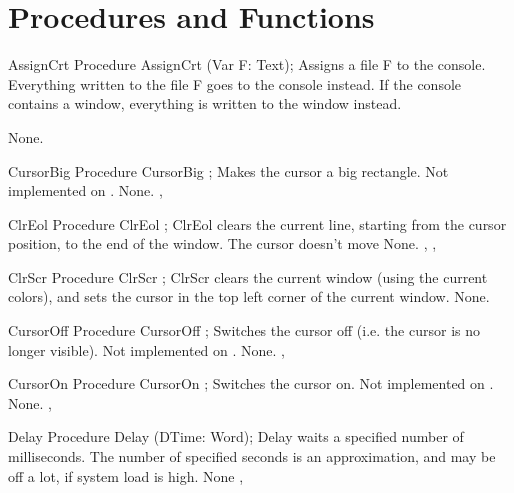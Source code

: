 \section{Procedures and Functions}

\begin{procedure}{AssignCrt}
\Declaration
Procedure AssignCrt (Var F: Text);
\Description
{} Assigns a file F to the console. Everything written to 
the file F goes to the console instead. If the console contains a window, 
everything is written to the window instead.

\Errors
None.
\SeeAlso
{}
\end{procedure}

 
\begin{procedure}{CursorBig}
\Declaration
Procedure CursorBig ;
\Description
Makes the cursor a big rectangle. 
Not implemented on \linux.
\Errors
None.
\SeeAlso
{}, 
\end{procedure}

\begin{procedure}{ClrEol}
\Declaration
Procedure ClrEol ;
\Description
 ClrEol clears the current line, starting from the cursor position, to the
end of the window. The cursor doesn't move
\Errors
None.
\SeeAlso
{}, , 
\end{procedure}

 
\begin{procedure}{ClrScr}
\Declaration
Procedure ClrScr ;
\Description
 ClrScr clears the current window (using the current colors), 
and sets the cursor in the top left
corner of the current window.
\Errors
None.
\SeeAlso
\end{procedure}

 
\begin{procedure}{CursorOff}
\Declaration
Procedure CursorOff ;
\Description
Switches the cursor off (i.e. the cursor is no
longer visible). 
Not implemented on \linux.
\Errors
None.
\SeeAlso
{}, 
\end{procedure}
\begin{procedure}{CursorOn}
\Declaration
Procedure CursorOn ;
\Description
Switches the cursor on. 
Not implemented on \linux.
\Errors
None.
\SeeAlso
{}, 
\end{procedure}
\begin{procedure}{Delay}
\Declaration
Procedure Delay (DTime: Word);
\Description
Delay waits a specified number of milliseconds. The number of specified
seconds is an approximation, and may be off a lot, if system load is high.
\Errors
None
\SeeAlso
{}, 
\end{procedure}

